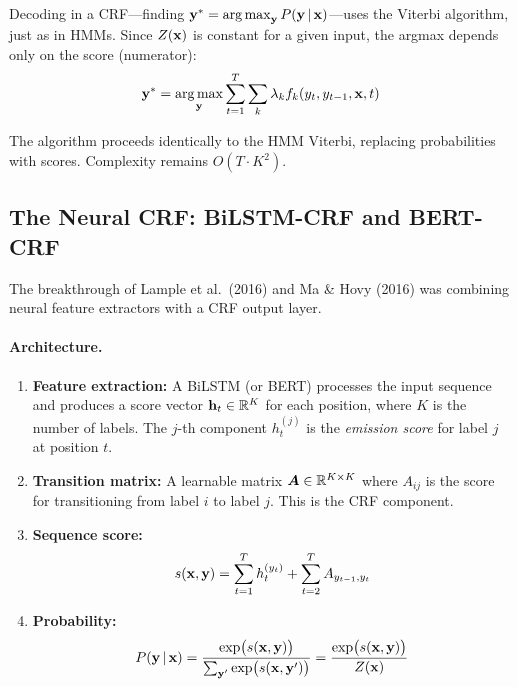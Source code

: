Decoding in a CRF---finding $\mathbf{y}^* = \operatorname*{arg\,max}_{\mathbf{y}} P(\mathbf{y} \,|\, \mathbf{x})$---uses
the Viterbi algorithm, just as in HMMs.  Since $Z(\mathbf{x})$ is constant for a
given input, the argmax depends only on the score (numerator):
\begin{equation}
\mathbf{y}^* = \operatorname*{arg\,max}_{\mathbf{y}} \sum_{t=1}^{T} \sum_{k} \lambda_k f_k(y_t, y_{t-1}, \mathbf{x}, t)
\end{equation}

The algorithm proceeds identically to the HMM Viterbi, replacing
probabilities with scores.  Complexity remains $O(T \cdot K^2)$.

\subsection{The Neural CRF: BiLSTM-CRF and BERT-CRF}
\label{sec:neural_crf}

The breakthrough of Lample et al.\ (2016) and Ma \& Hovy (2016) was combining
neural feature extractors with a CRF output layer.

\paragraph{Architecture.}
\begin{enumerate}
    \item \textbf{Feature extraction:} A BiLSTM (or BERT) processes the input
    sequence and produces a score vector $\mathbf{h}_t \in \mathbb{R}^K$ for each position,
    where $K$ is the number of labels.  The $j$-th component $h_t^{(j)}$
    is the \emph{emission score} for label $j$ at position $t$.

    \item \textbf{Transition matrix:} A learnable matrix $\bm{A} \in \mathbb{R}^{K \times K}$
    where $A_{ij}$ is the score for transitioning from label $i$ to label $j$.
    This is the CRF component.

    \item \textbf{Sequence score:}
    \begin{equation}
    s(\mathbf{x}, \mathbf{y}) = \sum_{t=1}^{T} h_t^{(y_t)} + \sum_{t=2}^{T} A_{y_{t-1}, y_t}
    \label{eq:neural_crf_score}
    \end{equation}

    \item \textbf{Probability:}
    \begin{equation}
    P(\mathbf{y} \,|\, \mathbf{x}) = \frac{\exp\bigl(s(\mathbf{x}, \mathbf{y})\bigr)}{\sum_{\mathbf{y}'} \exp\bigl(s(\mathbf{x}, \mathbf{y}')\bigr)}
    = \frac{\exp\bigl(s(\mathbf{x}, \mathbf{y})\bigr)}{Z(\mathbf{x})}
    \label{eq:neural_crf_prob}
    \end{equation}
\end{enumerate}

